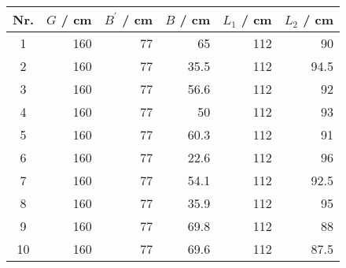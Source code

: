 \begin{tabular}{c|rrrrr}
Nr. & $G$ / cm & $B^\prime$ / cm & $B$ / cm & $L_1$ / cm & $L_2$ / cm \\
\hline
1 & 160 & 77 & 65 & 112 & 90\\
2 & 160 & 77 & 35.5 & 112 & 94.5\\
3 & 160 & 77 & 56.6 & 112 & 92\\
4 & 160 & 77 & 50 & 112 & 93\\
5 & 160 & 77 & 60.3 & 112 & 91\\
6 & 160 & 77 & 22.6 & 112 & 96\\
7 & 160 & 77 & 54.1 & 112 & 92.5\\
8 & 160 & 77 & 35.9 & 112 & 95\\
9 & 160 & 77 & 69.8 & 112 & 88\\
10 & 160 & 77 & 69.6 & 112 & 87.5
\end{tabular}
